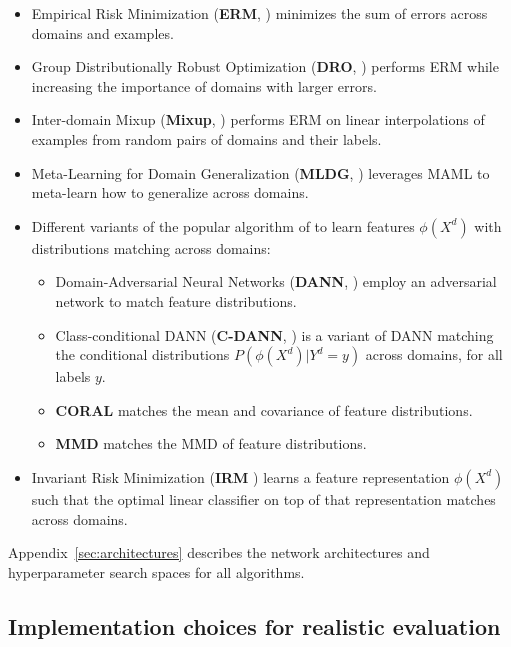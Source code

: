 \documentclass{article}
\begin{document}
\begin{itemize}
    \item Empirical Risk Minimization (\textbf{ERM}, \citet{vapnik1998statistical}) minimizes the sum of errors across domains and examples.
    \item Group Distributionally Robust Optimization (\textbf{DRO}, \citet{sagawa2019distributionally}) performs ERM while increasing the importance of domains with larger errors. 
    \item Inter-domain Mixup (\textbf{Mixup}, \citet{xu2019adversarial, yan2020improve, wang2020h}) performs ERM on linear interpolations of examples from random pairs of domains and their labels.
    \item Meta-Learning for Domain Generalization (\textbf{MLDG}, \citet{li2018learning}) leverages MAML \citep{finn2017model} to meta-learn how to generalize across domains. 
    \item Different variants of the popular algorithm of \citet{ganin2016domain} to learn features $\phi(X^d)$ with distributions matching across domains:
    \begin{itemize}
        \item Domain-Adversarial Neural Networks (\textbf{DANN}, \citet{ganin2016domain}) employ  an adversarial network to match feature distributions.
        \item Class-conditional DANN (\textbf{C-DANN}, \citet{li2018deep}) is a variant of DANN matching the conditional distributions $P(\phi(X^d) | Y^d = y)$ across domains, for all labels $y$.
        \item \textbf{CORAL} \citep{sun2016deep} matches the mean and covariance of feature distributions. 
        \item \textbf{MMD} \citep{li2018domain} matches the MMD \citep{gretton2012kernel} of feature distributions.
    \end{itemize}
    \item Invariant Risk Minimization (\textbf{IRM} \citep{arjovsky2019invariant}) learns a feature representation $\phi(X^d)$ such that the optimal linear classifier on top of that representation matches across domains.
\end{itemize}

Appendix~\ref{sec:architectures} describes the network architectures and hyperparameter search spaces for all algorithms.

\subsection{Implementation choices for realistic evaluation}
\end{document}
